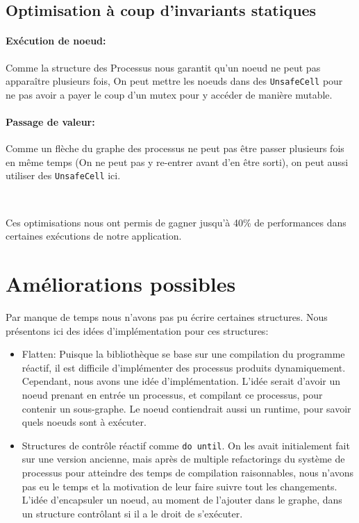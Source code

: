 \documentclass[a4paper]{article}
\renewcommand{\(}{\left(}
\renewcommand{\)}{\right)}
\begin{document}
\subsection{Optimisation à coup d'invariants statiques}

\paragraph{Exécution de noeud:} Comme la structure des Processus nous garantit
qu'un noeud ne peut pas apparaître plusieurs fois, On peut mettre les noeuds
dans des \verb!UnsafeCell! pour ne pas avoir a payer le coup d'un mutex pour y
accéder de manière mutable.

\paragraph{Passage de valeur:} Comme un flèche du graphe des processus ne peut
pas être passer plusieurs fois en même temps (On ne peut pas y re-entrer avant
d'en être sorti), on peut aussi utiliser des \verb!UnsafeCell! ici. 

\

Ces optimisations nous ont permis de gagner jusqu'à 40\% de performances dans
certaines exécutions de notre application.
\section{Améliorations possibles}

Par manque de temps nous n'avons pas pu
écrire certaines structures. Nous présentons ici des idées d'implémentation pour
ces structures:

\begin{itemize}
\item Flatten: Puisque la bibliothèque se base sur une compilation du programme
  réactif, il est difficile d'implémenter des processus produits dynamiquement.
  Cependant, nous avons une idée d'implémentation. L'idée serait d'avoir un
  noeud prenant en entrée un processus, et compilant ce processus, pour contenir
  un sous-graphe. Le noeud contiendrait aussi un runtime, pour savoir quels
  noeuds sont à exécuter.
\item Structures de contrôle réactif comme \verb!do until!. On les avait
  initialement fait sur une version ancienne, mais après de multiple refactorings
  du système de processus pour atteindre des temps de compilation raisonnables,
  nous n'avons pas eu le temps et la motivation de leur faire suivre tout les
  changements. L'idée d'encapsuler un noeud, au moment de l'ajouter dans le
  graphe, dans un structure contrôlant si il a le droit de s'exécuter.
\end{itemize}
\pagebreak
\end{document}
